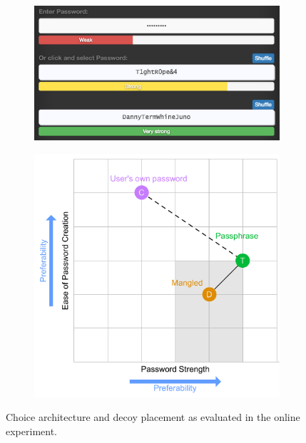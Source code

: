 \begin{figure}[t]
	\begin{subfigure}[t]{0.49\textwidth}
		\includegraphics[width=\textwidth]{figures/decoy/generator_prolific_3}
	\end{subfigure}
	\begin{subfigure}[t]{0.49\textwidth}
		\includegraphics[width=\textwidth]{figures/decoy/decoy-dimensions-prolific}\label{fig:decoy:dimensions-prolific}
	\end{subfigure}
	\caption{\label{fig:decoy:design-architecture-prolific}Choice architecture and decoy placement as evaluated in the online experiment. } 
\end{figure}

